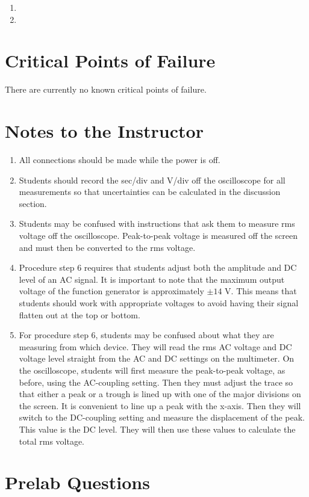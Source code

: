 \begin{enumerate}
\item 
\item 
\end{enumerate}

\section{Critical Points of Failure}

There are currently no known critical points of failure.

\section{Notes to the Instructor}
\begin{enumerate}
\item All connections should be made while the power is off.
\item Students should record the sec/div and V/div off the oscilloscope for all measurements so that uncertainties can be calculated in the discussion section.
\item Students may be confused with instructions that ask them to measure rms voltage off the oscilloscope. Peak-to-peak voltage is measured off the screen and must then be converted to the rms voltage.
\item Procedure step 6 requires that students adjust both the amplitude and DC level of an AC signal. It is important to note that the maximum output voltage of the function generator is approximately $\pm14$ V. This means that students should work with appropriate voltages to avoid having their signal flatten out at the top or bottom.
\item For procedure step 6, students may be confused about what they are measuring from which device. They will read the rms AC voltage and DC voltage level straight from the AC and DC settings on the multimeter. On the oscilloscope, students will first measure the peak-to-peak voltage, as before, using the AC-coupling setting. Then they must adjust the trace so that either a peak or a trough is lined up with one of the major divisions on the screen. It is convenient to line up a peak with the x-axis. Then they will switch to the DC-coupling setting and measure the displacement of the peak. This value is the DC level. They will then use these values to calculate the total rms voltage.
\end{enumerate}

\section{Prelab Questions}

